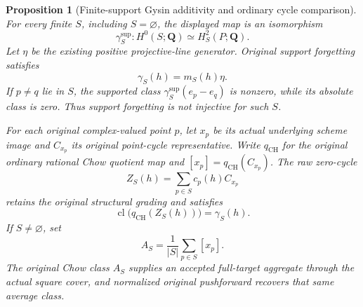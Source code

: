 \documentclass[11pt]{article}
\newtheorem{proposition}[theorem]{Proposition}
\theoremstyle{definition}
\theoremstyle{remark}
\DeclareMathOperator{\CH}{CH}
\newcommand{\Q}{\mathbf Q}
\begin{document}
\begin{proposition}[Finite-support Gysin additivity and ordinary cycle comparison]
\label{prop:p1-finite-support-gysin}
For every finite \(S\), including \(S=\varnothing\), the displayed
map is an isomorphism
\[
 \gamma_S^{\mathrm{sup}}:H^0(S;\Q)\simeq H^2_S(P;\Q).
\]
Let \(\eta\) be the existing positive projective-line generator.
Original support forgetting satisfies
\[
 \gamma_S(h)=m_S(h)\eta.
\]
If \(p\ne q\) lie in \(S\), the supported class
\(\gamma_S^{\mathrm{sup}}(e_p-e_q)\) is nonzero, while its
absolute class is zero. Thus support forgetting is not injective for
such \(S\).

For each original complex-valued point \(p\), let \(x_p\) be its
actual underlying scheme image and \(C_{x_p}\) its original point-cycle
representative. Write \(q_{\CH}\) for the original ordinary rational
Chow quotient map and \([x_p]=q_{\CH}(C_{x_p})\). The raw zero-cycle
\[
 Z_S(h)=\sum_{p\in S}c_p(h)C_{x_p}
\]
retains the original structural grading and satisfies
\[
 \operatorname{cl}\bigl(q_{\CH}(Z_S(h))\bigr)=\gamma_S(h).
\]
If \(S\ne\varnothing\), set
\[
 A_S=\frac{1}{|S|}\sum_{p\in S}[x_p].
\]
The original Chow class \(A_S\) supplies an accepted full-target
aggregate through the actual square cover, and normalized original
pushforward recovers that same average class.
\end{proposition}
\end{document}

